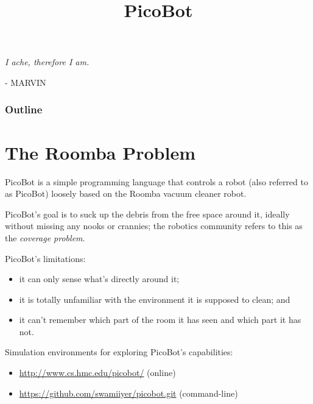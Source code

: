 \documentclass[8pt,a4paper,compress,handout]{beamer}
\title{PicoBot}
\date{}
\begin{document}
\begin{frame}
\hfill
\begin{minipage}{150pt}
\begin{flushright}
\tiny \emph{I ache, therefore I am.} 

\smallskip

- MARVIN
\end{flushright}
\end{minipage}
\titlepage
\end{frame}

\begin{frame}
\frametitle{Outline}
\tableofcontents
\end{frame}

\section{The Roomba Problem}
\begin{frame}[fragile]
PicoBot is a simple programming language that controls a robot (also referred to as PicoBot) loosely based on the Roomba vacuum cleaner robot.

\bigskip

PicoBot's goal is to suck up the debris from the free space around it, ideally without missing any nooks or crannies; the robotics community refers to this as the \emph{coverage problem}.

\bigskip

PicoBot's limitations:
\begin{itemize}
\item it can only sense what's directly around it; 

\item it is totally unfamiliar with the environment it is supposed to clean; and 

\item it can't remember which part of the room it has seen and which part it has not.
\end{itemize}

\bigskip

Simulation environments for exploring PicoBot's capabilities:
\begin{itemize}
\item \href{http://www.cs.hmc.edu/picobot/}{http://www.cs.hmc.edu/picobot/} (online)

\item \href{https://github.com/swamiiyer/picobot.git}{https://github.com/swamiiyer/picobot.git} (command-line)
\end{itemize}
\end{frame}
\end{document}
